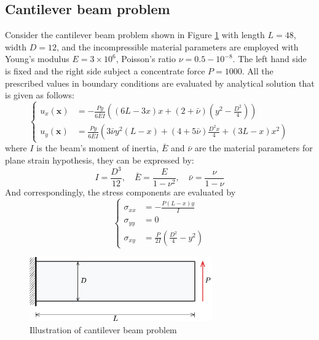 \subsection{Cantilever beam problem}\label{sec:cantilever}
Consider the cantilever beam problem shown in Figure \ref{fg:cantilever_model} with length $L = 48$, width $D = 12$, 
and the incompressible material parameters are employed with Young's modulus $E = 3\times 10^6$, Poisson's ratio $\nu = 0.5-10^{-8}$.
The left hand side is fixed and the right side subject a concentrate force $P = 1000$.
All the prescribed values in boundary conditions are evaluated by analytical solution that is given as follows\cite{timoshenko1969theory}:
\begin{equation}
    \left \{
        \begin{aligned}
        u_x(\boldsymbol x) &= - \frac{Py}{6\bar EI}
        \left (
            (6L - 3x)x + (2 + \bar \nu)(y^2 - \frac{D^2}{4})
        \right ) \\
        u_y(\boldsymbol x) &= \frac{Py}{6\bar EI}
        \left (
            3 \bar \nu y^2(L-x) + (4+5\bar \nu) \frac{D^2x}{4} + (3L-x)x^2
        \right )
        \end{aligned}
    \right .
\end{equation}
where $I$ is the beam's moment of inertia, $\bar E$ and $\bar \nu$ are the material parameters for plane strain hypothesis, they can be expressed by:
\begin{equation}
    I = \frac{D^3}{12}, \quad 
    \bar E = \frac{E}{1-\nu^2}, \quad 
    \bar \nu = \frac{\nu}{1-\nu}
\end{equation}
And correspondingly, the stress components are evaluated by
\begin{equation}
    \left \{
        \begin{aligned}
            \sigma_{xx} &= - \frac{P(L-x)y}{I} \\
            \sigma_{yy} &= 0 \\
            \sigma_{xy} &= \frac{P}{2I}(\frac{D^2}{4}-y^2)
        \end{aligned}
    \right .
\end{equation}

\begin{figure}[H]
\centering
\includegraphics[width=0.7\textwidth]{png/cantilever_model.png}
\caption{Illustration of cantilever beam problem}\label{fg:cantilever_model}
\end{figure}

